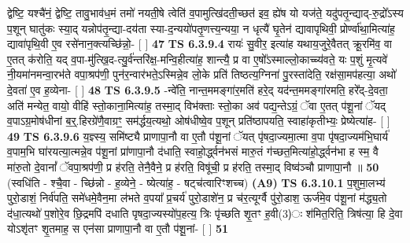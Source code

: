 \documentclass[17pt]{extarticle}
\begin{document}
                  द्वेष्टि॒ यश्चै॑नं॒ द्वेष्टि॒ तावु॒भाव॑ध॒मं तमो॑ नयती॒षे त्वेति॑ व॒पामुत्खि॑दती॒च्छत॑ इव॒ ह्ये॑ष यो यज॑ते॒ यदु॑पतृ॒न्द्याद्-रु॒द्रो᳚ऽस्य प॒शून् घातु॑कः स्या॒द् यन्नोप॑तृ॒न्द्या-दय॑ता स्या-द॒न्ययो॑पतृ॒णत्त्य॒न्यया॒ न धृत्यै॑ घृ॒तेन॑ द्यावापृथिवी॒ प्रोर्ण्वा॑था॒मित्या॑ह॒ द्यावा॑पृथि॒वी ए॒व रसे॑नान॒क्त्यच्छि॑न्नो॒- [  ] \textbf{  47} \newline
                  \newline
                                \textbf{ TS 6.3.9.4} \newline
                  रायः॑ सु॒वीर॒ इत्या॑ह यथाय॒जुरे॒वैतत् क्रू॒रमि॑व॒ वा ए॒तत् क॑रोति॒ यद् व॒पा-मु॑त्खि॒द-त्यु॒र्व॑न्तरि॑क्ष॒-मन्वि॒हीत्या॑ह॒ शान्त्यै॒ प्र वा ए॒षो᳚ऽस्माल्लो॒काच्च्य॑वते॒ यः प॒शुं मृ॒त्यवे॑ नी॒यमा॑नमन्वा॒रभ॑ते वपा॒श्रप॑णी॒ पुन॑र॒न्वार॑भते॒ऽस्मिन्ने॒व लो॒के प्रति॑ तिष्ठत्य॒ग्निना॑ पु॒रस्ता॑देति॒ रक्ष॑सा॒मप॑हत्या॒ अथो॑ दे॒वता॑ ए॒व ह॒व्येना- [  ] \textbf{  48} \newline
                  \newline
                                \textbf{ TS 6.3.9.5} \newline
                  -न्वे॑ति॒ नान्त॒ममङ्गा॑र॒मति॑ हरे॒द् यद॑न्त॒ममङ्गा॑रमति॒ हरे᳚द्-दे॒वता॒ अति॑ मन्येत॒ वायो॒ वीहि॑ स्तो॒काना॒मित्या॑ह॒ तस्मा॒द् विभ॑क्ताः स्तो॒का अव॑ पद्य॒न्तेऽग्रं॒ ॅवा ए॒तत् प॑शू॒नां ॅयद् व॒पाऽग्र॒मोष॑धीनां ब॒र्॒.हिरग्रे॑णै॒वाग्रꣳ॒॒ सम॑र्द्धय॒त्यथो॒ ओष॑धीष्वे॒व प॒शून् प्रति॑ष्ठापयति॒ स्वाहा॑कृतीभ्यः॒ प्रेष्येत्या॑ह- [  ] \textbf{  49} \newline
                  \newline
                                \textbf{ TS 6.3.9.6} \newline
                  य॒ज्ञ्स्य॒ समि॑ष्ट्यै प्राणापा॒नौ वा ए॒तौ प॑शू॒नां ॅयत् पृ॑षदा॒ज्यमा॒त्मा व॒पा पृ॑षदा॒ज्यम॑भि॒घार्य॑ व॒पाम॒भि घा॑रयत्या॒त्मन्ने॒व प॑शू॒नां प्रा॑णापा॒नौ द॑धाति॒ स्वाहो॒र्द्ध्वन॑भसं मारु॒तं ग॑च्छत॒मित्या॑हो॒र्द्ध्वन॑भा ह स्म॒ वै मा॑रु॒तो दे॒वानां᳚ ॅवपा॒श्रप॑णी॒ प्र ह॑रति॒ तेनै॒वैने॒ प्र ह॑रति॒ विषू॑ची॒ प्र ह॑रति॒ तस्मा॒द् विष्व॑ञ्चौ प्राणापा॒नौ ॥ \textbf{  50} \newline
                  \newline
                      (स्वधि॑ति - श्चै॒वा - च्छि॑न्नो - ह॒व्येने॒ - ष्येत्या॑ह॒ - षट्च॑त्वारिꣳशच्च)  \textbf{(A9)} \newline \newline
                                        \textbf{ TS 6.3.10.1} \newline
                  प॒शुमा॒लभ्य॑ पुरो॒डाशं॒ निर्व॑पति॒ समे॑धमे॒वैन॒मा ल॑भते व॒पया᳚ प्र॒चर्य॑ पुरो॒डाशे॑न॒ प्र च॑र॒त्यूर्ग्वै पु॑रो॒डाश॒ ऊर्ज॑मे॒व प॑शू॒नां म॑द्ध्य॒तो द॑धा॒त्यथो॑ प॒शोरे॒व छि॒द्रमपि॑ दधाति पृषदा॒ज्यस्यो॑प॒हत्य॒ त्रिः पृ॑च्छति शृ॒तꣳ ह॒वी(3)ः श॑मित॒रिति॒ त्रिष॑त्या॒ हि दे॒वा योऽशृ॑तꣳ शृ॒तमाह॒ स एन॑सा प्राणापा॒नौ वा ए॒तौ प॑शू॒नां- [  ] \textbf{  51} \newline
\end{document}
